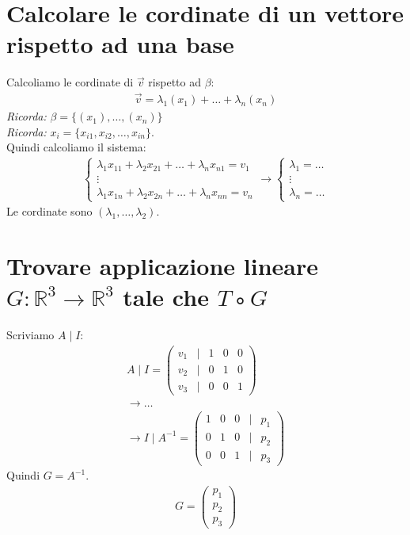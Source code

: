 \documentclass{article}
\begin{document}
\section{Calcolare le cordinate di un vettore rispetto ad una base}
Calcoliamo le cordinate di $\vec{v}$ rispetto ad $\beta$:
\begin{align*}
    \vec{v}=\lambda_1(x_1)+\dots+\lambda_n(x_n)
\end{align*}
\textit{Ricorda: } $\beta=\{(x_1),\dots,(x_n)\}$ \\
\textit{Ricorda: }$x_i=\{x_{i1},x_{i2},\dots,x_{in}\}$. \\
Quindi calcoliamo il sistema:
\begin{align*}
    \begin{cases}
        \lambda_1x_{11}+\lambda_2x_{21}+\dots+\lambda_nx_{n1}=v_1 \\
        \vdots \\
        \lambda_1x_{1n}+\lambda_2x_{2n}+\dots+\lambda_nx_{nn}=v_n
    \end{cases}
    \to 
    \begin{cases}
        \lambda_1=\dots \\
        \vdots \\
        \lambda_n=\dots
    \end{cases}
\end{align*}
Le cordinate sono $(\lambda_1,\dots,\lambda_2)$.

\section{Trovare applicazione lineare $G:\mathbb{R}^3 \to \mathbb{R}^3$ tale che $T $◦$ G$}
Scriviamo $A\mid I$:
\begin{align*}
    A\mid I = \begin{pmatrix}
        v_1 & | & 1 &0&0\\
        v_2  &|&0&1&0\\
        v_3 &|&0&0&1 
    \end{pmatrix}\\
    \to \dots \\
    \to I \mid A^{-1}=\begin{pmatrix}
        1 &0&0 &|& p_1\\
        0&1&0 & |&p_2\\
        0&0&1 & | & p_3
    \end{pmatrix}
\end{align*}
Quindi $G=A^{-1}$.
\begin{align*}
    G=\begin{pmatrix}
        p_1\\p_2\\p_3
    \end{pmatrix}
\end{align*}
\end{document}
